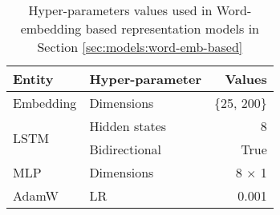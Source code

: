 

\begin{table}[htbp]
\centering
\begin{tabular}{llr}
\hline
\textbf{Entity} & \textbf{Hyper-parameter} & \textbf{Values} \\
\hline
Embedding & Dimensions & \{25, 200\} \\ \hline
\multirow{2}{*}{LSTM} & Hidden states & 8 \\
 & Bidirectional & True \\ \hline
MLP & Dimensions & 8 $\times$ 1 \\ \hline
AdamW & LR & 0.001 \\ \hline
\end{tabular}
\caption{Hyper-parameters values used in Word-embedding based representation models in Section \ref{sec:models:word-emb-based}}
\label{tab:models:hparams-word-emb-based}
\end{table}